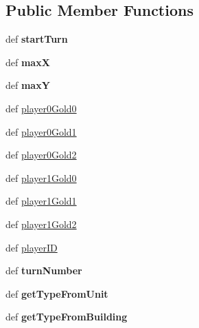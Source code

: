 \subsection*{Public Member Functions}
\begin{CompactItemize}
\item 
\hypertarget{classBaseAI_1_1BaseAI_2dcbc8732112a39869c75ed9f0771633}{
def \textbf{startTurn}}
\label{classBaseAI_1_1BaseAI_2dcbc8732112a39869c75ed9f0771633}

\item 
\hypertarget{classBaseAI_1_1BaseAI_2af064bcf3d6dc39cc12e6817b7250b0}{
def \textbf{maxX}}
\label{classBaseAI_1_1BaseAI_2af064bcf3d6dc39cc12e6817b7250b0}

\item 
\hypertarget{classBaseAI_1_1BaseAI_80d4e182743f2508af412b9bc6a8199c}{
def \textbf{maxY}}
\label{classBaseAI_1_1BaseAI_80d4e182743f2508af412b9bc6a8199c}

\item 
def \hyperlink{classBaseAI_1_1BaseAI_65c8f75088ac56f1eca6021bf4354059}{player0Gold0}
\item 
def \hyperlink{classBaseAI_1_1BaseAI_a94399280c90f9b944a3f8c53f46d187}{player0Gold1}
\item 
def \hyperlink{classBaseAI_1_1BaseAI_bc66afa5fd654c32639a40a4574d245e}{player0Gold2}
\item 
def \hyperlink{classBaseAI_1_1BaseAI_011f11f02555a0df44af4de27b0647b0}{player1Gold0}
\item 
def \hyperlink{classBaseAI_1_1BaseAI_e1ed9b73e407052b12422e1fbea89ff0}{player1Gold1}
\item 
def \hyperlink{classBaseAI_1_1BaseAI_f9137f6d3da694e0b7af0328478d2200}{player1Gold2}
\item 
def \hyperlink{classBaseAI_1_1BaseAI_60e0d6b3832faae7c85b4c9f0be10196}{playerID}
\item 
\hypertarget{classBaseAI_1_1BaseAI_fa3d3ad590dd453c4d064a3c16b7f1a8}{
def \textbf{turnNumber}}
\label{classBaseAI_1_1BaseAI_fa3d3ad590dd453c4d064a3c16b7f1a8}

\item 
\hypertarget{classBaseAI_1_1BaseAI_7498e24706e59d7f17240c467d5b8bee}{
def \textbf{getTypeFromUnit}}
\label{classBaseAI_1_1BaseAI_7498e24706e59d7f17240c467d5b8bee}

\item 
\hypertarget{classBaseAI_1_1BaseAI_25b93552cbb6c036c0a6e2071132f3ee}{
def \textbf{getTypeFromBuilding}}
\label{classBaseAI_1_1BaseAI_25b93552cbb6c036c0a6e2071132f3ee}


\end{CompactItemize}

